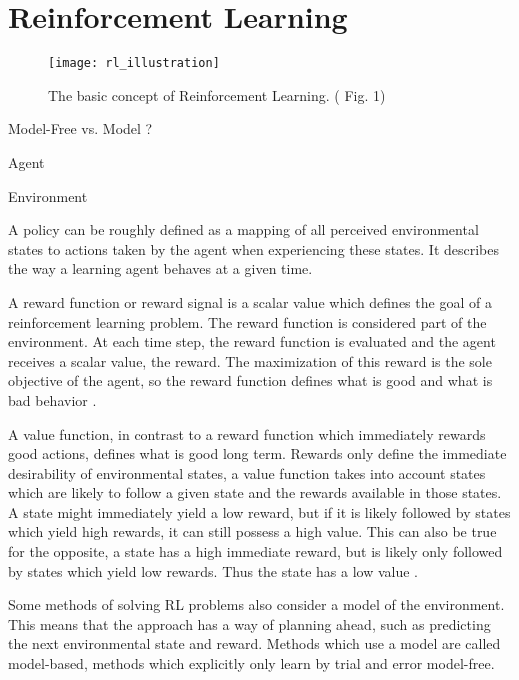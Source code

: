 

\section{Reinforcement Learning}

\parencite{weng2018bandit}
\parencite{sutton2018reinforcement}

\begin{figure}
	\centerline{\texttt{[image: rl\_illustration]}}
	\caption{The basic concept of Reinforcement Learning. (\cite{weng2018bandit} Fig. 1)}
	\label{RL Illustration}
\end{figure}

Model-Free vs. Model ?

Agent

Environment

A policy can be roughly defined as a mapping of all perceived environmental states to actions taken by the agent when experiencing these states.
It describes the way a learning agent behaves at a given time\parencite{sutton2018reinforcement}.

A reward function or reward signal is a scalar value which defines the goal of a reinforcement learning problem.
The reward function is considered part of the environment.
At each time step, the reward function is evaluated and the agent receives a scalar value, the reward.
The maximization of this reward is the sole objective of the agent, so the reward function defines what is good and what is bad behavior \parencite{sutton2018reinforcement}.

A value function, in contrast to a reward function which immediately rewards good actions, defines what is good long term. 
Rewards only define the immediate desirability of environmental states, a value function takes into account states which are likely to follow a given state and the rewards available in those states.
A state might immediately yield a low reward, but if it is likely followed by states which yield high rewards, it can still possess a high value.
This can also be true for the opposite, a state has a high immediate reward, but is likely only followed by states which yield low rewards. Thus the state has a low value \parencite{sutton2018reinforcement}.

Some methods of solving RL problems also consider a model of the environment. This means that the approach has a way of planning ahead, such as predicting the next environmental state and reward.
Methods which use a model are called model-based, methods which explicitly only learn by trial and error model-free\parencite{sutton2018reinforcement}.

